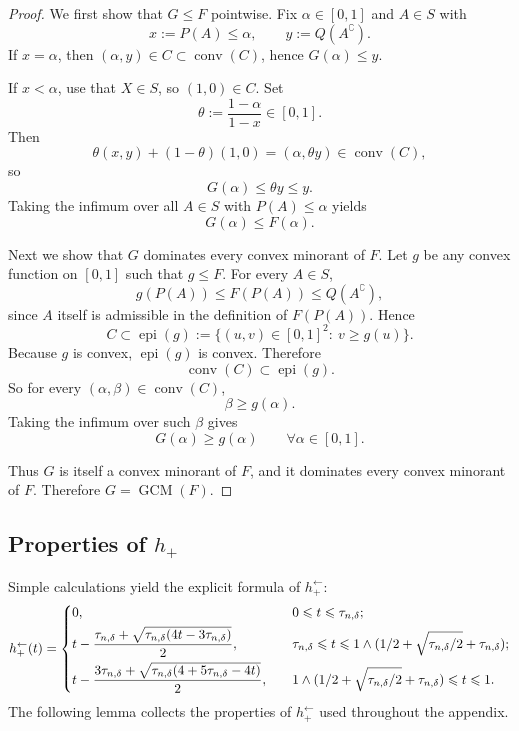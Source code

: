 \documentclass[english]{article}
\theoremstyle{plain}
\theoremstyle{definition}
\newcommand{\hinv}{h_+^{\leftarrow}}
\newcommand{\hup}{h_+}                             %
\begin{document}
\begin{proof}
We first show that $G\leqslant F$ pointwise. Fix $\alpha\in[0,1]$ and $A\in S$ with
\[
x:=P(A)\leqslant \alpha,
\qquad
y:=Q(A^{\complement}).
\]
If $x=\alpha$, then $(\alpha,y)\in C\subset \operatorname{conv}(C)$, hence $G(\alpha)\leqslant y$.

If $x<\alpha$, use that $X\in S$, so $(1,0)\in C$. Set
\[
\theta:=\frac{1-\alpha}{1-x}\in[0,1].
\]
Then
\[
\theta(x,y)+(1-\theta)(1,0)=(\alpha,\theta y)\in \operatorname{conv}(C),
\]
so
\[
G(\alpha)\leqslant \theta y\leqslant y.
\]
Taking the infimum over all $A\in S$ with $P(A)\leqslant \alpha$ yields
\[
G(\alpha)\leqslant F(\alpha).
\]

Next we show that $G$ dominates every convex minorant of $F$. Let $g$ be any convex function on
$[0,1]$ such that $g\leqslant F$. For every $A\in S$,
\[
g(P(A))\leqslant F(P(A))\leqslant Q(A^{\complement}),
\]
since $A$ itself is admissible in the definition of $F(P(A))$. Hence
\[
C\subset \operatorname{epi}(g):=\{(u,v)\in[0,1]^2:\ v\geqslant g(u)\}.
\]
Because $g$ is convex, $\operatorname{epi}(g)$ is convex. Therefore
\[
\operatorname{conv}(C)\subset \operatorname{epi}(g).
\]
So for every $(\alpha,\beta)\in \operatorname{conv}(C)$,
\[
\beta\geqslant g(\alpha).
\]
Taking the infimum over such $\beta$ gives
\[
G(\alpha)\geqslant g(\alpha)
\qquad\forall \alpha\in[0,1].
\]

Thus $G$ is itself a convex minorant of $F$, and it dominates every convex minorant of $F$.
Therefore $G=\operatorname{GCM}(F)$.
\end{proof}






\subsection{Properties of $\hup$}
Simple calculations yield the explicit formula of $\hinv$:
\begin{align*}
    \hinv(t)=\begin{dcases}
        0,\quad &0\leqslant t\leqslant \tau_{n,\delta};\\
        t-\frac{\tau_{n,\delta}+\sqrt{\tau_{n,\delta}(4t-3\tau_{n,\delta})}}{2},\quad &\tau_{n,\delta}\leqslant t\leqslant 1\wedge(1/2+\sqrt{\tau_{n,\delta}/2}+\tau_{n,\delta});\\
        t-\frac{3\tau_{n,\delta}+\sqrt{\tau_{n,\delta}(4+5\tau_{n,\delta}-4t)}}{2},\quad &1\wedge(1/2+\sqrt{\tau_{n,\delta}/2}+\tau_{n,\delta})\leqslant t\leqslant 1.
        \end{dcases}
    \end{align*}
The following lemma collects the properties of $\hinv$ used throughout the appendix.
\end{document}
